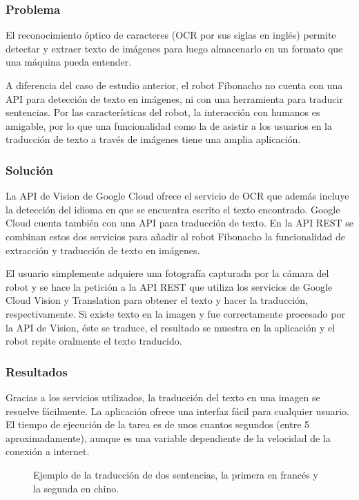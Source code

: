 \subsubsection{Problema}

El reconocimiento óptico de caracteres (OCR por sus siglas en inglés) permite detectar y extraer texto de imágenes para luego
almacenarlo en un formato que una máquina pueda entender.

A diferencia del caso de estudio anterior, el robot Fibonacho
no cuenta con una API para detección de
texto en imágenes, ni con una herramienta
para traducir sentencias. Por las características
del robot, la interacción con humanos es 
amigable, por lo que una funcionalidad como la de asistir
a los usuarios en la traducción de texto a través
de imágenes tiene una amplia aplicación.

\subsubsection{Solución}


La API de Vision de Google Cloud ofrece el servicio de OCR
que además incluye la detección del idioma en que se encuentra escrito el texto encontrado.
Google Cloud cuenta también con una API para traducción de 
texto.
En la API REST se combinan estos dos servicios
para añadir al robot Fibonacho la funcionalidad de extracción y traducción de texto en imágenes. 

El usuario simplemente adquiere una fotografía
capturada por la cámara del robot y se hace la petición
a la API REST que utiliza los servicios
de Google Cloud Vision y Translation para obtener el texto
y hacer la traducción, respectivamente.
Si existe texto en la imagen y fue correctamente procesado por
la API de Vision, éste se traduce, el resultado se muestra
en la aplicación y el robot repite oralmente
el texto traducido.

\subsubsection{Resultados}

Gracias a los servicios utilizados, la traducción 
del texto en una imagen se resuelve fácilmente.
La aplicación ofrece una interfaz fácil para cualquier
usuario. El tiempo de ejecución de la tarea
es de unos cuantos segundos (entre 5 aproximadamente), aunque es
una variable dependiente de la velocidad de la conexión 
a internet.


\begin{figure}[htbp]
    \centering
    \qquad
    \caption{Ejemplo de la traducción
    de dos sentencias, la primera en francés y la segunda
    en chino.}
\end{figure}

